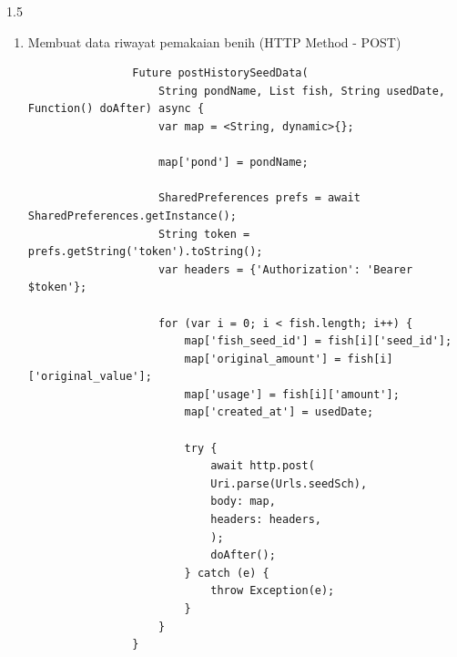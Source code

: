 \begin{spacing}{1.5}
\begin{enumerate}
\begin{enumerate}
			\begin{lstlisting}
				Future getHistorySeedData(bool isReversed, String firstDate, String lastDate,
					String name, Function() doAfter) async {
						seedHistoryList.value.data!.clear();
						isLoadingHistory.value = true;
					
						SharedPreferences prefs = await SharedPreferences.getInstance();
						String token = prefs.getString('token').toString();
						var headers = {'Authorization': 'Bearer $token'};
					
						final response = await http.get(
							Uri.parse(
								'${Urls.seedSch}?start_date=$firstDate&end_date=$lastDate&name=$name'),
							headers: headers,
						);
					
						try {
							if (response.statusCode == 200) {
							HistorySeedModel res =
								HistorySeedModel.fromJson(jsonDecode(response.body));
					
							if (isReversed) {
								var temp = res;
								seedHistoryList.value.data = temp.data!.reversed.toList();
							} else {
								var temp = res;
								seedHistoryList.value.data = temp.data!;
							}
					
							doAfter();
							}
						} catch (e) {
							throw Exception(e);
						}
						isLoadingHistory.value = false;
					}
			\end{lstlisting}

			\item Membuat data riwayat pemakaian benih (HTTP Method - POST)
			
			\begin{lstlisting}
				Future postHistorySeedData(
					String pondName, List fish, String usedDate, Function() doAfter) async {
					var map = <String, dynamic>{};

					map['pond'] = pondName;

					SharedPreferences prefs = await SharedPreferences.getInstance();
					String token = prefs.getString('token').toString();
					var headers = {'Authorization': 'Bearer $token'};

					for (var i = 0; i < fish.length; i++) {
						map['fish_seed_id'] = fish[i]['seed_id'];
						map['original_amount'] = fish[i]['original_value'];
						map['usage'] = fish[i]['amount'];
						map['created_at'] = usedDate;

						try {
							await http.post(
							Uri.parse(Urls.seedSch),
							body: map,
							headers: headers,
							);
							doAfter();
						} catch (e) {
							throw Exception(e);
						}
					}
				}
			\end{lstlisting}
		\end{enumerate}


\end{enumerate}
\end{spacing}
